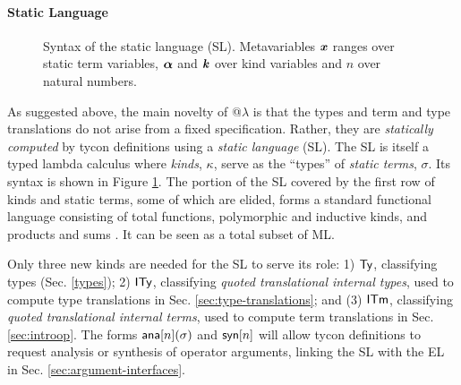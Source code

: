 \documentclass[pldi]{sigplanconf-pldi15}
\begin{document}
\paragraph{Static Language}
\begin{figure}[t]
\small
\hspace{-5px}
\caption{Syntax of the static language (SL). Metavariables ${\textbf{\textit{x}}}$ ranges over static term variables, $\boldsymbol{\alpha}$ and $\textbf{\textit{k}}$ over kind variables and $n$ over natural numbers.}\vspace{-10px}
\label{syntax-SL}
\end{figure}
As suggested above, the main novelty of @$\lambda$ is that the types and term and type translations do not arise from a fixed specification. Rather, they are \emph{statically computed} by tycon definitions using a \emph{static language} (SL). The SL is itself a typed lambda calculus where  
\emph{kinds}, $\kappa$, serve as the ``types'' of \emph{static terms}, $\sigma$.  Its syntax is shown in Figure \ref{syntax-SL}. The portion of the SL covered by the first row of kinds and static terms, some of which are elided, forms a standard functional language consisting of total functions, polymorphic and inductive kinds, and products and sums  \cite{pfpl}. It can be seen as a total subset of ML.%

Only three new  kinds are needed for the SL to serve its role: 1) ${\sf Ty}$, classifying types (Sec. \ref{types}); 2) ${\sf ITy}$, classifying \emph{quoted translational internal types}, used to {compute} type translations in Sec. \ref{sec:type-translations}; and (3) ${\sf ITm}$, classifying \emph{quoted translational internal terms}, used to {compute} term translations in Sec. \ref{sec:introop}. The forms ${\sf ana}[n](\sigma)$ and ${\sf syn}[n]$ will  allow tycon definitions to request analysis or synthesis of operator arguments, linking the SL with the  EL in Sec. \ref{sec:argument-interfaces}.
\end{document}

